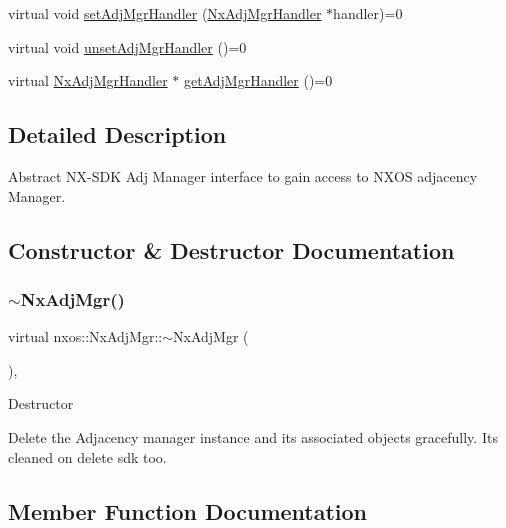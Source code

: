 \begin{DoxyCompactItemize}
\item 
virtual void \mbox{\hyperlink{classnxos_1_1_nx_adj_mgr_afc37b95ddfe24357cfd0803cad8feb74}{set\+Adj\+Mgr\+Handler}} (\mbox{\hyperlink{classnxos_1_1_nx_adj_mgr_handler}{Nx\+Adj\+Mgr\+Handler}} $\ast$handler)=0
\item 
virtual void \mbox{\hyperlink{classnxos_1_1_nx_adj_mgr_a9937a382ff7f6eb789b728a2512e37f3}{unset\+Adj\+Mgr\+Handler}} ()=0
\item 
virtual \mbox{\hyperlink{classnxos_1_1_nx_adj_mgr_handler}{Nx\+Adj\+Mgr\+Handler}} $\ast$ \mbox{\hyperlink{classnxos_1_1_nx_adj_mgr_a0a25f49f42b92d373d341d3b013c7404}{get\+Adj\+Mgr\+Handler}} ()=0
\end{DoxyCompactItemize}


\subsection{Detailed Description}
Abstract N\+X-\/\+S\+DK Adj Manager interface to gain access to N\+X\+OS adjacency Manager. 

\subsection{Constructor \& Destructor Documentation}
\mbox{\label{classnxos_1_1_nx_adj_mgr_a771d390eda9cac623c3b8f9452721da5}} 
\subsubsection{\texorpdfstring{$\sim$\+Nx\+Adj\+Mgr()}{~NxAdjMgr()}}
{\footnotesize\ttfamily virtual nxos\+::\+Nx\+Adj\+Mgr\+::$\sim$\+Nx\+Adj\+Mgr (\begin{DoxyParamCaption}{ }\end{DoxyParamCaption})\hspace{0.3cm}{\ttfamily [inline]}, {\ttfamily [virtual]}}

Destructor

Delete the Adjacency manager instance and its associated objects gracefully. Its cleaned on delete sdk too. 

\subsection{Member Function Documentation}
\mbox{\label{classnxos_1_1_nx_adj_mgr_a9c347e5836f0ec686fe6605a41fbef5e}} 
